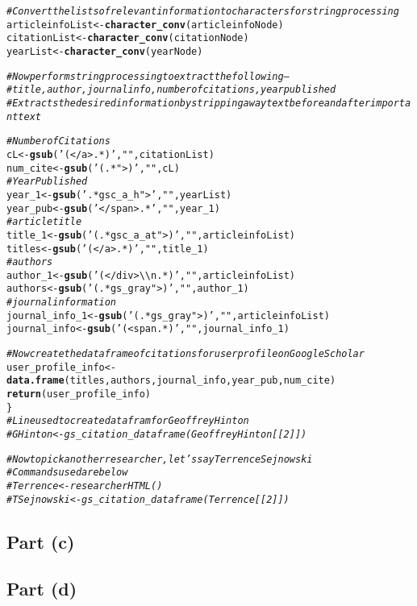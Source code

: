 \documentclass{article}\usepackage[]{graphicx}\usepackage[]{color}
\makeatletter
\newcommand{\hlstr}[1]{\textcolor[rgb]{0.192,0.494,0.8}{#1}}%
\newcommand{\hlcom}[1]{\textcolor[rgb]{0.678,0.584,0.686}{\textit{#1}}}%
\newcommand{\hlstd}[1]{\textcolor[rgb]{0.345,0.345,0.345}{#1}}%
\newcommand{\hlkwb}[1]{\textcolor[rgb]{0.69,0.353,0.396}{#1}}%
\newcommand{\hlkwd}[1]{\textcolor[rgb]{0.737,0.353,0.396}{\textbf{#1}}}%
\newenvironment{kframe}{%
 \def\at@end@of@kframe{}%
 \ifinner\ifhmode%
  \def\at@end@of@kframe{\end{minipage}}%
  \begin{minipage}{\columnwidth}%
 \fi\fi%
 \def\FrameCommand##1{\hskip\@totalleftmargin \hskip-\fboxsep
 \colorbox{shadecolor}{##1}\hskip-\fboxsep
     \hskip-\linewidth \hskip-\@totalleftmargin \hskip\columnwidth}%
 \MakeFramed {\advance\hsize-\width
   \@totalleftmargin\z@ \linewidth\hsize
   \@setminipage}}%
 {\par\unskip\endMakeFramed%
 \at@end@of@kframe}
\newenvironment{knitrout}{}{} %
\makeatother
\begin{document}
\begin{knitrout}
\begin{kframe}
\begin{alltt}
  \hlcom{#Convert the lists of relevant information to characters for string processing}
  \hlstd{articleinfoList}\hlkwb{<-}\hlkwd{character_conv}\hlstd{(articleinfoNode)}
  \hlstd{citationList}\hlkwb{<-}\hlkwd{character_conv}\hlstd{(citationNode)}
  \hlstd{yearList}\hlkwb{<-}\hlkwd{character_conv}\hlstd{(yearNode)}

  \hlcom{#Now perform string processing to extract the following--}
  \hlcom{#title, author, journal info, number of citations, year published}
  \hlcom{#Extracts the desired information by stripping away text before and after important text}

  \hlcom{#Number of Citations}
  \hlstd{cL}\hlkwb{<-}\hlkwd{gsub}\hlstd{(}\hlstr{'(</a>.*)'}\hlstd{,}\hlstr{""}\hlstd{,citationList)}
  \hlstd{num_cite}\hlkwb{<-}\hlkwd{gsub}\hlstd{(}\hlstr{'(.*">)'}\hlstd{,}\hlstr{""}\hlstd{,cL)}
  \hlcom{#Year Published}
  \hlstd{year_1}\hlkwb{<-}\hlkwd{gsub}\hlstd{(}\hlstr{'.*gsc_a_h">'}\hlstd{,}\hlstr{""}\hlstd{,yearList)}
  \hlstd{year_pub}\hlkwb{<-}\hlkwd{gsub}\hlstd{(}\hlstr{'</span>.*'}\hlstd{,}\hlstr{""}\hlstd{,year_1)}
  \hlcom{#article title}
  \hlstd{title_1}\hlkwb{<-}\hlkwd{gsub}\hlstd{(}\hlstr{'(.*gsc_a_at">)'}\hlstd{,}\hlstr{""}\hlstd{,articleinfoList)}
  \hlstd{titles}\hlkwb{<-}\hlkwd{gsub}\hlstd{(}\hlstr{'(</a>.*)'}\hlstd{,}\hlstr{""}\hlstd{,title_1)}
  \hlcom{#authors}
  \hlstd{author_1}\hlkwb{<-}\hlkwd{gsub}\hlstd{(}\hlstr{'(</div>\textbackslash{}\textbackslash{}n.*)'}\hlstd{,}\hlstr{""}\hlstd{,articleinfoList)}
  \hlstd{authors}\hlkwb{<-}\hlkwd{gsub}\hlstd{(}\hlstr{'(.*gs_gray">)'}\hlstd{,}\hlstr{""}\hlstd{,author_1)}
  \hlcom{#journal information}
  \hlstd{journal_info_1}\hlkwb{<-}\hlkwd{gsub}\hlstd{(}\hlstr{'(.*gs_gray">)'}\hlstd{,}\hlstr{""}\hlstd{,articleinfoList)}
  \hlstd{journal_info}\hlkwb{<-}\hlkwd{gsub}\hlstd{(}\hlstr{'(<span.*)'}\hlstd{,}\hlstr{""}\hlstd{,journal_info_1)}

  \hlcom{#Now create the dataframe of citations for user profile on Google Scholar}
  \hlstd{user_profile_info}\hlkwb{<-}\hlkwd{data.frame}\hlstd{(titles, authors, journal_info, year_pub, num_cite)}
  \hlkwd{return}\hlstd{(user_profile_info)}
\hlstd{\}}
\hlcom{#Line used to create data fram for Geoffrey Hinton}
\hlcom{#GHinton<-gs_citation_dataframe(GeoffreyHinton[[2]])}

\hlcom{#Now to pick another researcher, let's say Terrence Sejnowski}
\hlcom{#Commands used are below}
\hlcom{#Terrence<-researcherHTML()}
\hlcom{#TSejnowski<-gs_citation_dataframe(Terrence[[2]])}
\end{alltt}
\end{kframe}
\end{knitrout}
\subsection{Part (c)}
\subsection{Part (d)}
\end{document}
